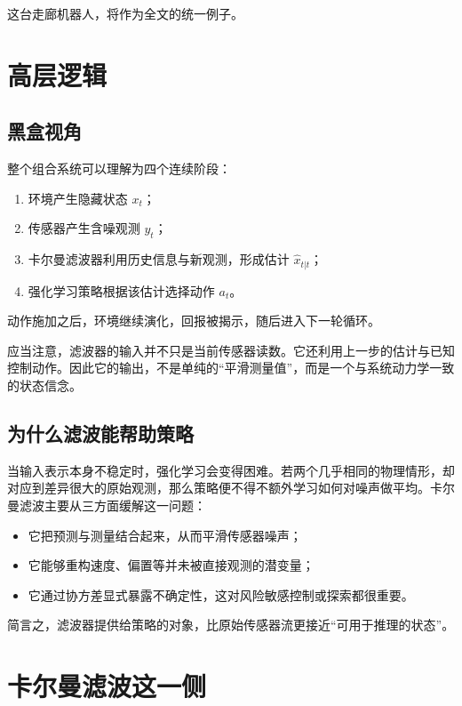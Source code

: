 \documentclass[12pt,a4paper]{ctexart}
\begin{document}
这台走廊机器人，将作为全文的统一例子。

\section{高层逻辑}

\subsection{黑盒视角}

整个组合系统可以理解为四个连续阶段：

\begin{enumerate}
  \item 环境产生隐藏状态 \(x_t\)；
  \item 传感器产生含噪观测 \(y_t\)；
  \item 卡尔曼滤波器利用历史信息与新观测，形成估计 \(\hat{x}_{t|t}\)；
  \item 强化学习策略根据该估计选择动作 \(a_t\)。
\end{enumerate}

动作施加之后，环境继续演化，回报被揭示，随后进入下一轮循环。

应当注意，滤波器的输入并不只是当前传感器读数。它还利用上一步的估计与已知控制动作。因此它的输出，不是单纯的“平滑测量值”，而是一个与系统动力学一致的状态信念。

\subsection{为什么滤波能帮助策略}

当输入表示本身不稳定时，强化学习会变得困难。若两个几乎相同的物理情形，却对应到差异很大的原始观测，那么策略便不得不额外学习如何对噪声做平均。卡尔曼滤波主要从三方面缓解这一问题：

\begin{itemize}
  \item 它把预测与测量结合起来，从而平滑传感器噪声；
  \item 它能够重构速度、偏置等并未被直接观测的潜变量；
  \item 它通过协方差显式暴露不确定性，这对风险敏感控制或探索都很重要。
\end{itemize}

简言之，滤波器提供给策略的对象，比原始传感器流更接近“可用于推理的状态”。

\section{卡尔曼滤波这一侧}
\end{document}
